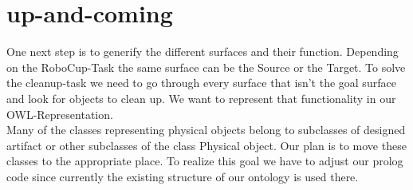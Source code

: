 \documentclass[main.tex]{subfiles}
\begin{document}
		\section{up-and-coming}
		One next step is to generify the different surfaces and their function. Depending on the RoboCup-Task the same surface can be the Source or the Target. To solve the cleanup-task we need to go through every surface that isn't the goal surface and look for objects to clean up. We want to represent that functionality in our OWL-Representation. \\
		Many of the classes representing physical objects belong to subclasses of designed artifact or other subclasses of the class Physical object. Our plan is to move these classes to the appropriate place. To realize this goal we have to adjust our prolog code since currently the existing structure of our ontology is used there.
\end{document}
